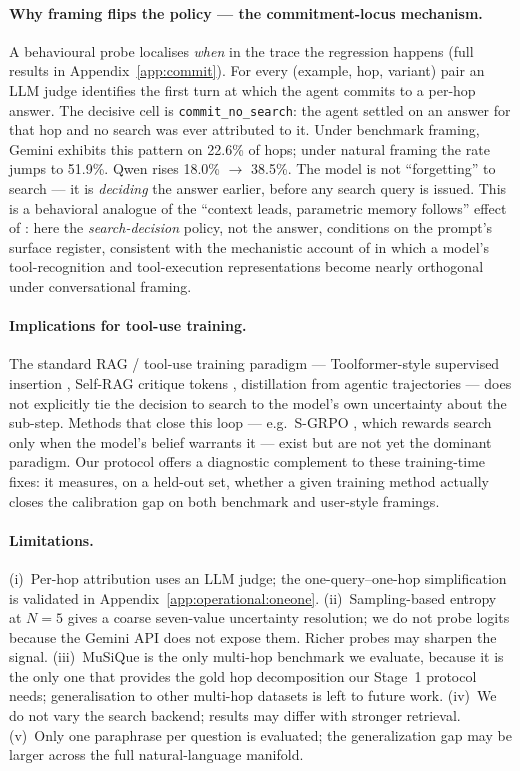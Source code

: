 \documentclass[10pt,letterpaper]{article}
\begin{document}
\paragraph{Why framing flips the policy --- the commitment-locus mechanism.}
A behavioural probe localises \emph{when} in the trace the regression happens
(full results in Appendix~\ref{app:commit}). For every (example, hop, variant) pair an
LLM judge identifies the first turn at which the agent commits to a per-hop answer.
The decisive cell is \texttt{commit\_no\_search}: the agent settled on an answer for
that hop and no search was ever attributed to it. Under benchmark framing, Gemini
exhibits this pattern on 22.6\% of hops; under natural framing the rate jumps to
51.9\%. Qwen rises 18.0\% $\to$ 38.5\%. The model is not ``forgetting'' to search ---
it is \emph{deciding} the answer earlier, before any search query is issued. This is a
behavioral analogue of the ``context leads, parametric memory follows'' effect of
\citet{tao2024context}: here the \emph{search-decision} policy, not the answer,
conditions on the prompt's surface register, consistent with the
mechanistic account of \citet{knowingdoing2026} in which a model's tool-recognition
and tool-execution representations become nearly orthogonal under conversational
framing.

\paragraph{Implications for tool-use training.}
The standard RAG / tool-use training paradigm --- Toolformer-style supervised insertion
\citep{toolformer2023}, Self-RAG critique tokens \citep{selfrag2024}, distillation from
agentic trajectories \citep{rare2025} --- does not explicitly tie the decision to
search to the model's own uncertainty about the sub-step. Methods that close this loop
--- e.g.\ S-GRPO \citep{sgrpo2025}, which rewards search only when the model's belief
warrants it --- exist but are not yet the dominant paradigm. Our protocol offers a
diagnostic complement to these training-time fixes: it measures, on a held-out set,
whether a given training method actually closes the calibration gap on both benchmark
and user-style framings.

\paragraph{Limitations.}
(i)~Per-hop attribution uses an LLM judge; the one-query--one-hop simplification is
validated in Appendix~\ref{app:operational:oneone}.
(ii)~Sampling-based entropy at $N{=}5$ gives a coarse seven-value uncertainty
resolution; we do not probe logits because the Gemini API does not expose them.
Richer probes \citep{evidential2026,sep2024} may sharpen the signal.
(iii)~MuSiQue is the only multi-hop benchmark we evaluate, because it is the only one
that provides the gold hop decomposition our Stage~1 protocol needs; generalisation to
other multi-hop datasets is left to future work.
(iv)~We do not vary the search backend; results may differ with stronger retrieval.
(v)~Only one paraphrase per question is evaluated; the generalization gap may be
larger across the full natural-language manifold.
\end{document}
